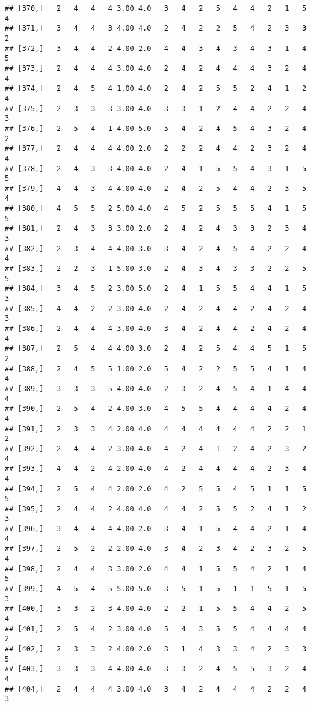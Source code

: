 \documentclass[]{article}
\begin{document}
\begin{verbatim}
## [370,]   2   4   4   4 3.00 4.0   3   4   2   5   4   4   2   1   5   4
## [371,]   3   4   4   3 4.00 4.0   2   4   2   2   5   4   2   3   3   2
## [372,]   3   4   4   2 4.00 2.0   4   4   3   4   3   4   3   1   4   5
## [373,]   2   4   4   4 3.00 4.0   2   4   2   4   4   4   3   2   4   4
## [374,]   2   4   5   4 1.00 4.0   2   4   2   5   5   2   4   1   2   4
## [375,]   2   3   3   3 3.00 4.0   3   3   1   2   4   4   2   2   4   3
## [376,]   2   5   4   1 4.00 5.0   5   4   2   4   5   4   3   2   4   2
## [377,]   2   4   4   4 4.00 2.0   2   2   2   4   4   2   3   2   4   4
## [378,]   2   4   3   3 4.00 4.0   2   4   1   5   5   4   3   1   5   5
## [379,]   4   4   3   4 4.00 4.0   2   4   2   5   4   4   2   3   5   4
## [380,]   4   5   5   2 5.00 4.0   4   5   2   5   5   5   4   1   5   5
## [381,]   2   4   3   3 3.00 2.0   2   4   2   4   3   3   2   3   4   3
## [382,]   2   3   4   4 4.00 3.0   3   4   2   4   5   4   2   2   4   4
## [383,]   2   2   3   1 5.00 3.0   2   4   3   4   3   3   2   2   5   5
## [384,]   3   4   5   2 3.00 5.0   2   4   1   5   5   4   4   1   5   3
## [385,]   4   4   2   2 3.00 4.0   2   4   2   4   4   2   4   2   4   3
## [386,]   2   4   4   4 3.00 4.0   3   4   2   4   4   2   4   2   4   4
## [387,]   2   5   4   4 4.00 3.0   2   4   2   5   4   4   5   1   5   2
## [388,]   2   4   5   5 1.00 2.0   5   4   2   2   5   5   4   1   4   4
## [389,]   3   3   3   5 4.00 4.0   2   3   2   4   5   4   1   4   4   4
## [390,]   2   5   4   2 4.00 3.0   4   5   5   4   4   4   4   2   4   4
## [391,]   2   3   3   4 2.00 4.0   4   4   4   4   4   4   2   2   1   2
## [392,]   2   4   4   2 3.00 4.0   4   2   4   1   2   4   2   3   2   4
## [393,]   4   4   2   4 2.00 4.0   4   2   4   4   4   4   2   3   4   4
## [394,]   2   5   4   4 2.00 2.0   4   2   5   5   4   5   1   1   5   5
## [395,]   2   4   4   2 4.00 4.0   4   4   2   5   5   2   4   1   2   3
## [396,]   3   4   4   4 4.00 2.0   3   4   1   5   4   4   2   1   4   4
## [397,]   2   5   2   2 2.00 4.0   3   4   2   3   4   2   3   2   5   4
## [398,]   2   4   4   3 3.00 2.0   4   4   1   5   5   4   2   1   4   5
## [399,]   4   5   4   5 5.00 5.0   3   5   1   5   1   1   5   1   5   3
## [400,]   3   3   2   3 4.00 4.0   2   2   1   5   5   4   4   2   5   4
## [401,]   2   5   4   2 3.00 4.0   5   4   3   5   5   4   4   4   4   2
## [402,]   2   3   3   2 4.00 2.0   3   1   4   3   3   4   2   3   3   5
## [403,]   3   3   3   4 4.00 4.0   3   3   2   4   5   5   3   2   4   4
## [404,]   2   4   4   4 3.00 4.0   3   4   2   4   4   4   2   2   4   3

\end{verbatim}
\end{document}
